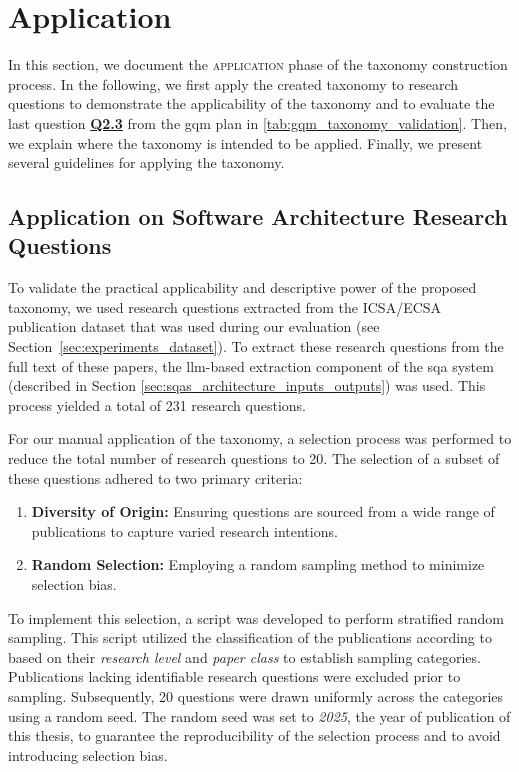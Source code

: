 
\section{Application}
\label{sec:taxonomy_application}

In this section, we document the \textsc{application} phase of the taxonomy construction process. In the following, we first apply the created taxonomy to research questions to demonstrate the applicability of the taxonomy and to evaluate the last question \hyperref[tab:gqm_taxonomy_validation]{\textbf{Q2.3}} from the \gls{gqm} plan in \ref{tab:gqm_taxonomy_validation}. Then, we explain where the taxonomy is intended to be applied. Finally, we present several guidelines for applying the taxonomy.

\subsection[Application on SWA Research Questions]{Application on Software Architecture Research Questions}
\label{sec:application_on_research_questions}

To validate the practical applicability and descriptive power of the proposed taxonomy, we used research questions extracted from the ICSA/ECSA publication dataset that was used during our evaluation (see Section~\ref{sec:experiments_dataset}). To extract these research questions from the full text of these papers, the \gls{llm}-based extraction component of the \gls{sqa} system (described in Section \ref{sec:sqas_architecture_inputs_outputs}) was used. This process yielded a total of 231 research questions.

For our manual application of the taxonomy, a selection process was performed to reduce the total number of research questions to 20. The selection of a subset of these questions adhered to two primary criteria:
\begin{enumerate}
    \item \textbf{Diversity of Origin:} Ensuring questions are sourced from a wide range of publications to capture varied research intentions.
    \item \textbf{Random Selection:} Employing a random sampling method to minimize selection bias.
\end{enumerate}

To implement this selection, a script was developed to perform stratified random sampling. This script utilized the classification of the publications according to \cite{konersmann_evaluation_2022} based on their \emph{research level} and \emph{paper class} to establish sampling categories. Publications lacking identifiable research questions were excluded prior to sampling. Subsequently, 20 questions were drawn uniformly across the categories using a random seed. The random seed was set to \emph{2025}, the year of publication of this thesis, to guarantee the reproducibility of the selection process and to avoid introducing selection bias.

